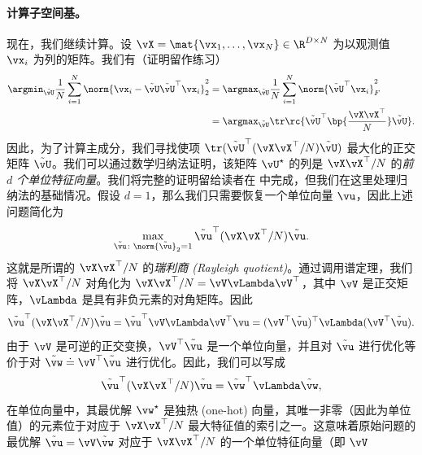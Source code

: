 \documentclass[../../book-main_zh.tex]{subfiles}
\begin{document}
\paragraph{计算子空间基。}
现在，我们继续计算。设 \(\vX = \mat{\vx_{1},
\dots, \vx_{N}} \in \R^{D \times N}\) 为以观测值 \(\vx_{i}\) 为列的矩阵。我们有（证明留作练习）
\begin{align}
    \argmin_{\tilde{\vU}}\frac{1}{N}\sum_{i = 1}^{N}\norm{\vx_{i} -
    \tilde{\vU}\tilde{\vU}^{\top}\vx_{i}}_{2}^{2}
    &= \argmax_{\tilde{\vU}}\frac{1}{N}\sum_{i =
    1}^{N}\norm{\tilde{\vU}^{\top}\vx_{i}}_{F}^{2} \\
    &=
    \argmax_{\tilde{\vU}}\tr\rc{\tilde{\vU}^{\top}\bp{\frac{\vX\vX^{\top}}{N}}\tilde{\vU}}.
\end{align}
因此，为了计算主成分，我们寻找使项
\(\tr(\tilde{\vU}^{\top}(\vX\vX^{\top}/N)\tilde{\vU})\) 最大化的正交矩阵
\(\tilde{\vU}\)。我们可以通过数学归纳法证明，该矩阵 \(\vU^{\star}\) 的列是
\(\vX\vX^{\top}/N\) 的\textit{前 \(d\) 个单位特征向量}。我们将完整的证明留给读者在
中完成，但我们在这里处理归纳法的基础情况。假设 \(d = 1\)，那么我们只需要恢复一个单位向量 \(\vu\)，因此上述问题简化为
\begin{equation}
    \max_{\tilde{\vu} \colon \norm{\tilde{\vu}}_{2} = 1}
    \tilde{\vu}^{\top}(\vX\vX^{\top}/N)\tilde{\vu}.
\end{equation}
这就是所谓的 \(\vX\vX^{\top}/N\) 的\textit{瑞利商 (Rayleigh
quotient)}。通过调用谱定理，我们将 \(\vX\vX^{\top}/N\) 对角化为 \(\vX\vX^{\top}/N =
\vV\vLambda\vV^{\top}\)，其中 \(\vV\) 是正交矩阵，\(\vLambda\) 是具有非负元素的对角矩阵。因此
\begin{equation}
    \tilde{\vu}^{\top}(\vX\vX^{\top}/N)\tilde{\vu} =
    \tilde{\vu}^{\top}\vV\vLambda\vV^{\top}\vu =
    (\vV^{\top}\tilde{\vu})^{\top}\vLambda(\vV^{\top}\tilde{\vu}).
\end{equation}
由于 \(\vV\) 是可逆的正交变换，\(\vV^{\top}\tilde{\vu}\) 是一个单位向量，并且对
\(\tilde{\vu}\) 进行优化等价于对 \(\tilde{\vw} \doteq
\vV^{\top}\tilde{\vu}\) 进行优化。因此，我们可以写成
\begin{equation}
    \tilde{\vu}^{\top}(\vX\vX^{\top}/N)\tilde{\vu} =
    \tilde{\vw}^{\top}\vLambda\tilde{\vw},
\end{equation}
在单位向量中，其最优解 \(\vw^{\star}\) 是独热 (one-hot) 向量，其唯一非零（因此为单位值）的元素位于对应于
\(\vX\vX^{\top}/N\) 最大特征值的索引之一。这意味着原始问题的最优解 \(\tilde{\vu} =
\vV\tilde{\vw}\) 对应于 \(\vX\vX^{\top}/N\) 的一个单位特征向量（即 \(\vV\)
\end{document}
